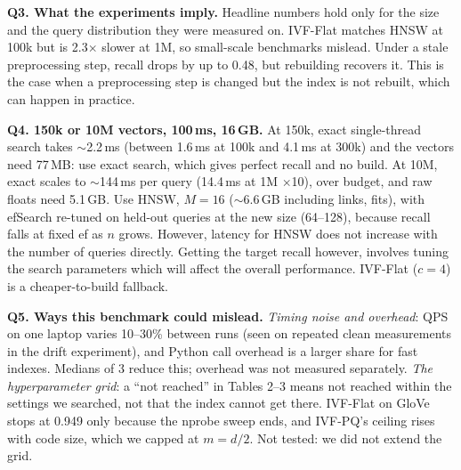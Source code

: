 \documentclass[10pt,a4paper]{article}
\begin{document}
\textbf{Q3. What the experiments imply.} Headline numbers hold only for the size and the query
distribution they were measured on. IVF-Flat matches HNSW at 100k but is 2.3$\times$ slower at
1M, so small-scale benchmarks mislead. Under a stale preprocessing step, recall drops by up to 0.48, but rebuilding recovers it. This is the case when a preprocessing step is changed but the index is not rebuilt, which can happen in practice.

\textbf{Q4. 150k or 10M vectors, 100\,ms, 16\,GB.} At 150k, exact single-thread search takes
$\sim$2.2\,ms (between 1.6\,ms at 100k and 4.1\,ms at 300k) and the vectors need 77\,MB: use
exact search, which gives perfect recall and no build. At 10M, exact scales to $\sim$144\,ms per
query (14.4\,ms at 1M $\times$10), over budget, and raw floats need 5.1\,GB. Use HNSW, $M=16$
($\sim$6.6\,GB including links, fits), with efSearch re-tuned on held-out queries at the new size
(64--128), because recall falls at fixed ef as $n$ grows. However, latency for HNSW does not increase with the number of queries directly. Getting the target recall however, involves tuning the search parameters which will affect the overall performance. IVF-Flat ($c=4$) is a cheaper-to-build
fallback.

\textbf{Q5. Ways this benchmark could mislead.} \emph{Timing noise and overhead}: QPS on one
laptop varies 10--30\% between runs (seen on repeated clean measurements in the drift
experiment), and Python call overhead is a larger share for fast indexes. Medians of 3 reduce
this; overhead was not measured separately. \emph{The hyperparameter grid}: a ``not reached'' in Tables 2--3 means not reached within the
settings we searched, not that the index cannot get there. IVF-Flat on GloVe stops at 0.949 only
because the nprobe sweep ends, and IVF-PQ's ceiling rises with code size, which we capped at
$m=d/2$. Not tested: we did not extend the grid.
\end{document}

